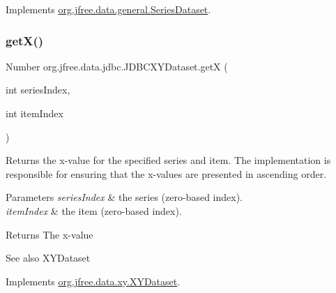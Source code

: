 Implements \mbox{\hyperlink{interfaceorg_1_1jfree_1_1data_1_1general_1_1_series_dataset_a60488892b2314a05a012999e26a74178}{org.\+jfree.\+data.\+general.\+Series\+Dataset}}.

\mbox{\label{classorg_1_1jfree_1_1data_1_1jdbc_1_1_j_d_b_c_x_y_dataset_ae8e467b524a18e629f7777a5cd54e349}} 
\subsubsection{\texorpdfstring{get\+X()}{getX()}}
{\footnotesize\ttfamily Number org.\+jfree.\+data.\+jdbc.\+J\+D\+B\+C\+X\+Y\+Dataset.\+getX (\begin{DoxyParamCaption}\item[{int}]{series\+Index,  }\item[{int}]{item\+Index }\end{DoxyParamCaption})}

Returns the x-\/value for the specified series and item. The implementation is responsible for ensuring that the x-\/values are presented in ascending order.


\begin{DoxyParams}{Parameters}
{\em series\+Index} & the series (zero-\/based index). \\
\hline
{\em item\+Index} & the item (zero-\/based index).\\
\hline
\end{DoxyParams}
\begin{DoxyReturn}{Returns}
The x-\/value
\end{DoxyReturn}
\begin{DoxySeeAlso}{See also}
X\+Y\+Dataset 
\end{DoxySeeAlso}


Implements \mbox{\hyperlink{interfaceorg_1_1jfree_1_1data_1_1xy_1_1_x_y_dataset_a85c75ba5b69b551e96afd29d1732ba22}{org.\+jfree.\+data.\+xy.\+X\+Y\+Dataset}}.

\mbox{\label{classorg_1_1jfree_1_1data_1_1jdbc_1_1_j_d_b_c_x_y_dataset_a82d15ff790d019c18338037925dc8685}} 
